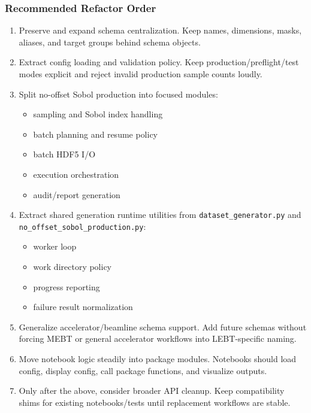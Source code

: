 \documentclass[
]{article}
\providecommand{\tightlist}{%
  \setlength{\itemsep}{0pt}\setlength{\parskip}{0pt}}
\begin{document}
\hypertarget{recommended-refactor-order}{%
\subsubsection{Recommended Refactor
Order}\label{recommended-refactor-order}}

\begin{enumerate}
\def\labelenumi{\arabic{enumi}.}
\item
  Preserve and expand schema centralization. Keep names, dimensions,
  masks, aliases, and target groups behind schema objects.
\item
  Extract config loading and validation policy. Keep
  production/preflight/test modes explicit and reject invalid production
  sample counts loudly.
\item
  Split no-offset Sobol production into focused modules:

  \begin{itemize}
  \tightlist
  \item
    sampling and Sobol index handling
  \item
    batch planning and resume policy
  \item
    batch HDF5 I/O
  \item
    execution orchestration
  \item
    audit/report generation
  \end{itemize}
\item
  Extract shared generation runtime utilities from
  \texttt{dataset\_generator.py} and
  \texttt{no\_offset\_sobol\_production.py}:

  \begin{itemize}
  \tightlist
  \item
    worker loop
  \item
    work directory policy
  \item
    progress reporting
  \item
    failure result normalization
  \end{itemize}
\item
  Generalize accelerator/beamline schema support. Add future schemas
  without forcing MEBT or general accelerator workflows into
  LEBT-specific naming.
\item
  Move notebook logic steadily into package modules. Notebooks should
  load config, display config, call package functions, and visualize
  outputs.
\item
  Only after the above, consider broader API cleanup. Keep compatibility
  shims for existing notebooks/tests until replacement workflows are
  stable.
\end{enumerate}
\end{document}
